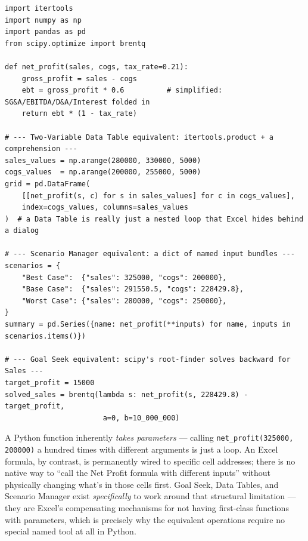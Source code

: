\documentclass[11pt,a4paper]{article}
\begin{document}
\begin{lstlisting}[style=pythonstyle, caption={All three What-If tools in Python: this is dramatically less friction than in Excel, because a Python function already takes parameters}]
import itertools
import numpy as np
import pandas as pd
from scipy.optimize import brentq

def net_profit(sales, cogs, tax_rate=0.21):
    gross_profit = sales - cogs
    ebt = gross_profit * 0.6          # simplified: SG&A/EBITDA/D&A/Interest folded in
    return ebt * (1 - tax_rate)

# --- Two-Variable Data Table equivalent: itertools.product + a comprehension ---
sales_values = np.arange(280000, 330000, 5000)
cogs_values  = np.arange(200000, 255000, 5000)
grid = pd.DataFrame(
    [[net_profit(s, c) for s in sales_values] for c in cogs_values],
    index=cogs_values, columns=sales_values
)  # a Data Table is really just a nested loop that Excel hides behind a dialog

# --- Scenario Manager equivalent: a dict of named input bundles ---
scenarios = {
    "Best Case":  {"sales": 325000, "cogs": 200000},
    "Base Case":  {"sales": 291550.5, "cogs": 228429.8},
    "Worst Case": {"sales": 280000, "cogs": 250000},
}
summary = pd.Series({name: net_profit(**inputs) for name, inputs in scenarios.items()})

# --- Goal Seek equivalent: scipy's root-finder solves backward for Sales ---
target_profit = 15000
solved_sales = brentq(lambda s: net_profit(s, 228429.8) - target_profit,
                       a=0, b=10_000_000)
\end{lstlisting}

\begin{protip}
A Python function inherently \emph{takes parameters} --- calling \texttt{net\_profit(325000, 200000)} a hundred times with different arguments is just a loop. An Excel formula, by contrast, is permanently wired to specific cell addresses; there is no native way to ``call the Net Profit formula with different inputs'' without physically changing what's in those cells first. Goal Seek, Data Tables, and Scenario Manager exist \emph{specifically} to work around that structural limitation --- they are Excel's compensating mechanisms for not having first-class functions with parameters, which is precisely why the equivalent operations require no special named tool at all in Python.
\end{protip}
\end{document}

